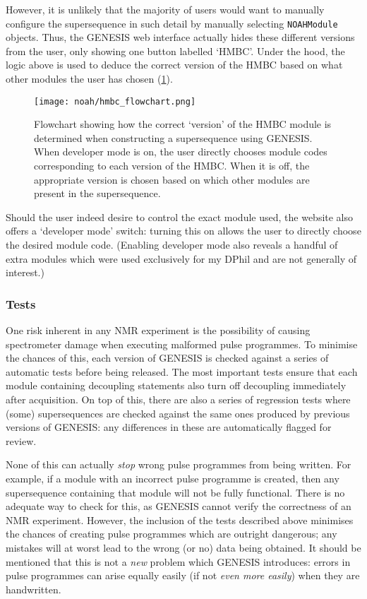 However, it is unlikely that the majority of users would want to manually configure the supersequence in such detail by manually selecting \texttt{NOAHModule} objects.
Thus, the GENESIS web interface actually hides these different versions from the user, only showing one button labelled `HMBC'.
Under the hood, the logic above is used to deduce the correct version of the HMBC based on what other modules the user has chosen (\cref{fig:hmbc_flowchart}).

\begin{figure}[htb]
    \centering
    \texttt{[image: noah/hmbc\_flowchart.png]}%
    \caption[Flowchart for choosing HMBC module version]{
        Flowchart showing how the correct `version' of the HMBC module is determined when constructing a supersequence using GENESIS.
        When developer mode is on, the user directly chooses module codes corresponding to each version of the HMBC.
        When it is off, the appropriate version is chosen based on which other modules are present in the supersequence.
    }
    \label{fig:hmbc_flowchart}
\end{figure}

Should the user indeed desire to control the exact module used, the website also offers a `developer mode' switch: turning this on allows the user to directly choose the desired module code.
(Enabling developer mode also reveals a handful of extra modules which were used exclusively for my DPhil and are not generally of interest.)


\subsubsection{Tests}

One risk inherent in any NMR experiment is the possibility of causing spectrometer damage when executing malformed pulse programmes.
To minimise the chances of this, each version of GENESIS is checked against a series of automatic tests before being released.
The most important tests ensure that each module containing decoupling statements also turn off decoupling immediately after acquisition.
On top of this, there are also a series of regression tests where (some) supersequences are checked against the same ones produced by previous versions of GENESIS: any differences in these are automatically flagged for review.

None of this can actually \textit{stop} wrong pulse programmes from being written.
For example, if a module with an incorrect pulse programme is created, then any supersequence containing that module will not be fully functional.
There is no adequate way to check for this, as GENESIS cannot verify the correctness of an NMR experiment.
However, the inclusion of the tests described above minimises the chances of creating pulse programmes which are outright dangerous; any mistakes will at worst lead to the wrong (or no) data being obtained.
It should be mentioned that this is not a \textit{new} problem which GENESIS introduces: errors in pulse programmes can arise equally easily (if not \textit{even more easily}) when they are handwritten.



